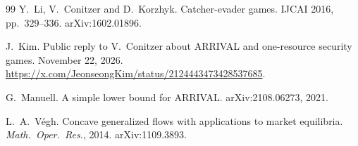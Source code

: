 \begin{thebibliography}{99}
 Y.~Li, V.~Conitzer and D.~Korzhyk. Catcher-evader games. IJCAI 2016, pp.~329--336.
arXiv:1602.01896.

 J.~Kim. Public reply to V.~Conitzer about ARRIVAL and one-resource
security games. November 22, 2026.
\url{https://x.com/JeonseongKim/status/2124443473428537685}.

 G.~Manuell. A simple lower bound for ARRIVAL. arXiv:2108.06273, 2021.

 L.~A.~V\'egh. Concave generalized flows with applications to market equilibria.
\emph{Math.\ Oper.\ Res.}, 2014. arXiv:1109.3893.

\end{thebibliography}
